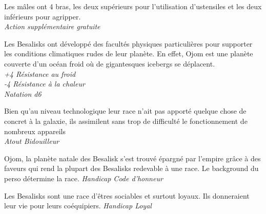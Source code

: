 \begin{description}[align=left]
\item [A bras le corps]         %
    Les mâles ont 4 bras, les deux supérieurs pour l’utilisation d’ustensiles et les deux inférieurs pour agripper.\\
    \textit{Action supplémentaire gratuite}

\item [Pas frileux]             %
    Les Besalisks ont développé des facultés physiques particulières pour supporter les conditions climatiques rudes de leur planète. En effet, Ojom est une planète couverte d’un océan froid où de gigantesques icebergs se déplacent.\\
    \textit{+4 Résistance au froid}\\
    \textit{-4 Résistance à la chaleur}\\
    \textit{Natation d6}

\item [Bricoleur]               %
    Bien qu’au niveau technologique leur race n’ait pas apporté quelque chose de concret à la galaxie, ils assimilent sans trop de difficulté le fonctionnement de nombreux appareils\\
    \textit{Atout Bidouilleur}

\item [Dette de Liberté]        %
    Ojom, la planète natale des Besalisk s’est trouvé épargné par l’empire grâce à des faveurs qui rend la plupart des Besalisks redevable à une race. Le background du perso détermine la race.
    \textit{Handicap Code d’honneur}

\item [Loyal]                   %
    Les Besalisks sont une race d’êtres sociables et surtout loyaux. Ils donneraient leur vie pour leurs coéquipiers.
    \textit{Handicap Loyal}
\end{description}